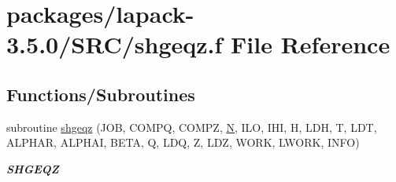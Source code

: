 \hypertarget{shgeqz_8f}{}\section{packages/lapack-\/3.5.0/\+S\+R\+C/shgeqz.f File Reference}
\label{shgeqz_8f}
\subsection*{Functions/\+Subroutines}
\begin{DoxyCompactItemize}
\item 
subroutine \hyperlink{group__realGEcomputational_gaabb10a799ac110d898984792acafa8f4}{shgeqz} (J\+O\+B, C\+O\+M\+P\+Q, C\+O\+M\+P\+Z, \hyperlink{polmisc_8c_a0240ac851181b84ac374872dc5434ee4}{N}, I\+L\+O, I\+H\+I, H, L\+D\+H, T, L\+D\+T, A\+L\+P\+H\+A\+R, A\+L\+P\+H\+A\+I, B\+E\+T\+A, Q, L\+D\+Q, Z, L\+D\+Z, W\+O\+R\+K, L\+W\+O\+R\+K, I\+N\+F\+O)
\begin{DoxyCompactList}\small\item\em {\bfseries S\+H\+G\+E\+Q\+Z} \end{DoxyCompactList}\end{DoxyCompactItemize}
